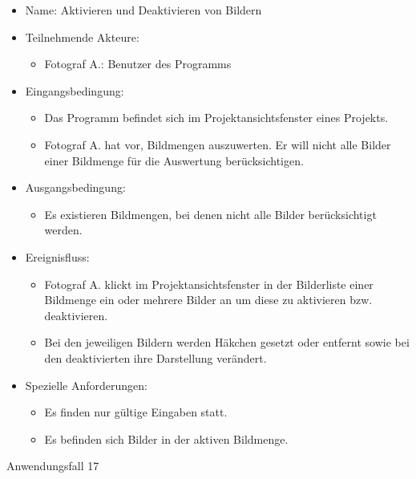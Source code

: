 	\begin{itemize}
		\item Name: Aktivieren und Deaktivieren von Bildern
		\item Teilnehmende Akteure:
		\begin{itemize}
			\item	Fotograf A.: Benutzer des Programms		
		\end{itemize}
		\item Eingangsbedingung:
		\begin{itemize}
			\item	Das Programm befindet sich im Projektansichtsfenster eines Projekts.
			\item Fotograf A. hat vor, Bildmengen auszuwerten. Er will nicht alle Bilder einer Bildmenge für die Auswertung berücksichtigen.
		\end{itemize}
		\item Ausgangsbedingung:
		\begin{itemize}
			\item	Es existieren Bildmengen, bei denen nicht alle Bilder berücksichtigt werden.	
		\end{itemize}
		\item Ereignisfluss:
		\begin{itemize}
			\item Fotograf A. klickt im Projektansichtsfenster in der Bilderliste einer Bildmenge ein oder mehrere Bilder an um diese zu aktivieren bzw. deaktivieren.
			\item Bei den jeweiligen Bildern werden Häkchen gesetzt oder entfernt sowie bei den deaktivierten ihre Darstellung verändert.
		\end{itemize}
		\item Spezielle Anforderungen:
		\begin{itemize}
			\item	Es finden nur gültige Eingaben statt.
			\item Es befinden sich Bilder in der aktiven Bildmenge.
		\end{itemize}			
	\end{itemize}
	
	\begin{description}
		\item[Anwendungsfall 17]
	\end{description}
	

